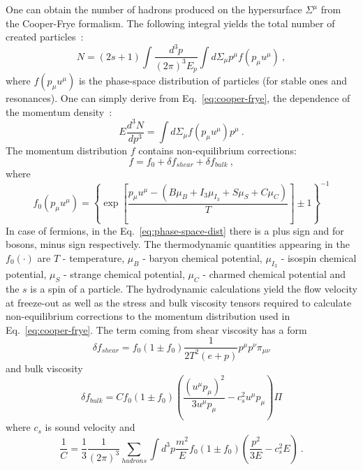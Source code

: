       One can obtain the number of hadrons produced on the hypersurface $\Sigma^{\mu}$ from the Cooper-Frye formalism.
      The following integral yields the total number of created particles~\cite{therminator2}:
      \begin{equation}
        \label{eq:cooper-frye}
        N = (2s+1) \int \frac{d^3p}{(2\pi)^3 E_p} \int d\Sigma_{\mu} p^\mu f(p_\mu u^\mu)~,
      \end{equation}
      where $f(p_\mu u^\mu)$
      is the phase-space distribution of particles (for stable ones and resonances).
      One can simply derive from Eq.~\ref{eq:cooper-frye}, the dependence of the momentum density~\cite{cooperfrye}:
      \begin{equation}
        E \frac{d^3 N}{d p^3} = \int  d \Sigma_\mu f(p_\mu u^\mu)p^\mu~.
      \end{equation}
      The momentum distribution $f$ contains non-equilibrium corrections:
      \begin{equation}
        f = f_0 + \delta f_{shear} + \delta f_{bulk}~,
      \end{equation}
      where 
      \begin{equation}
        \label{eq:phase-space-dist}
        f_0(p_\mu u^\mu) = \left\{ \exp\left[ \frac{p_\mu u^\mu - (B \mu_B + I_3 \mu_{I_3}+S\mu_S + C \mu_C)}{T} \right] \pm 1 \right\}^{-1}
      \end{equation}
      In case of fermions, in the Eq.~\ref{eq:phase-space-dist} there is a plus sign and for bosons, minus sign respectively.
      The thermodynamic quantities appearing in the $f_0(\cdot)$ are $T$ - temperature, $\mu_B$ - baryon chemical potential, $\mu_{I_3}$ - isospin chemical potential, $\mu_S$ - strange chemical potential, $\mu_C$ - charmed chemical potential and the $s$ is a spin of a particle.
      The hydrodynamic calculations yield the flow velocity at freeze-out as well as the stress and bulk viscosity tensors required to calculate non-equilibrium corrections to the momentum distribution used in Eq.~\ref{eq:cooper-frye}.
      The term coming from shear viscosity has a form~\cite{visc_hydro}
      \begin{equation}
        \delta f_{shear} = f_0 (1 \pm f_0) \frac{1}{2T^2 (e + p)} p^\mu p^\nu \pi_{\mu\nu}
      \end{equation}
      and bulk viscosity
      \begin{equation}
        \delta f_{bulk} = C f_0 (1 \pm f_0) \left( \frac{(u^\mu p_\mu)^2}{3 u^\mu p_\mu} - c^2_s u^\mu p_\mu\right) \Pi
      \end{equation}
      where $c_s$ is sound velocity and
      \begin{equation}
        \frac{1}{C} = \frac{1}{3} \frac{1}{(2\pi)^3}\sum\limits_{hadrons} \int d^3 p \frac{m^2}{E} f_0 (1 \pm f_0) \left( \frac{p^2}{3E} - c_s^2 E \right)~.
      \end{equation}

